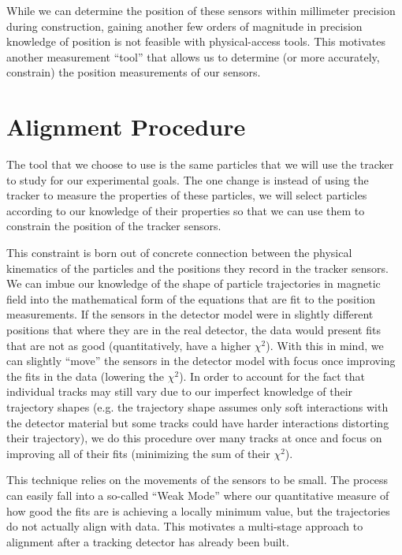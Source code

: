 While we can determine the position of these sensors within millimeter precision during
construction, gaining another few orders of magnitude in precision knowledge of position is not
feasible with physical-access tools.  This motivates another measurement ``tool'' that allows us to determine (or more
accurately, constrain) the position measurements of our sensors.

\section{Alignment Procedure}
The tool that we choose to use is the same particles that we will use the tracker to study for our
experimental goals. The one change is instead of using the tracker to measure the properties of
these particles, we will select particles according to our knowledge of their properties so that we
can use them to constrain the position of the tracker sensors.

This constraint is born out of concrete connection between the physical kinematics of the particles
and the positions they record in the tracker sensors. We can imbue our knowledge of the shape of
particle trajectories in magnetic field into the mathematical form of the equations that are fit to
the position measurements. If the sensors in the detector model were in slightly different
positions that where they are in the real detector, the data would present fits that are not as
good (quantitatively, have a higher $\chi^2$). With this in mind, we can slightly ``move'' the
sensors in the detector model with focus once improving the fits in the data (lowering the
$\chi^2$). In order to account for the fact that individual tracks may still vary due to our
imperfect knowledge of their trajectory shapes (e.g. the trajectory shape assumes only soft
interactions with the detector material but some tracks could have harder interactions distorting
their trajectory), we do this procedure over many tracks at once and focus on improving all of
their fits (minimizing the sum of their $\chi^2$).

This technique relies on the movements of the sensors to be small. The process can easily fall into
a so-called ``Weak Mode'' where our quantitative measure of how good the fits are is achieving a
locally minimum value, but the trajectories do not actually align with data. This motivates a
multi-stage approach to alignment after a tracking detector has already been built.

